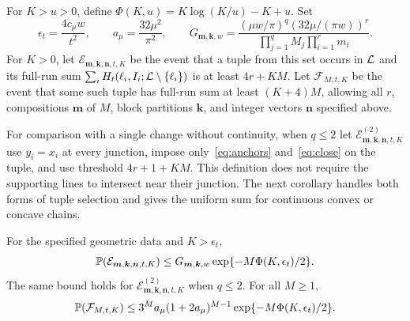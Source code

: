 \documentclass[11pt,letterpaper]{article}
\begin{document}
For $K>u>0$, define $\Phi(K,u)=K\log(K/u)-K+u$. Set
\begin{equation}\label{eq:constants}
 \epsilon_t=\frac{4c_\mu w}{t^2},\qquad
 a_\mu=\frac{32\mu^2}{\pi^2},\qquad
 G_{\boldsymbol m,\boldsymbol k,w}
 =\frac{(\mu w/\pi)^q(32\mu/(\pi w))^r}
        {\prod_{j=1}^qM_j\prod_{i=1}^r m_i}.
\end{equation}
For $K>0$, let $\mathcal E_{\boldsymbol m,\boldsymbol k,\boldsymbol n,t,K}$ be the event that a tuple from this set occurs in $\cL$ and its full-run sum $\sum_iH_t(\ell_i,I_i;\cL\setminus\{\ell_i\})$ is at least $4r+KM$. Let $\mathcal F_{M,t,K}$ be the event that some such tuple has full-run sum at least $(K+4)M$, allowing all $r$, compositions $\boldsymbol m$ of $M$, block partitions $\boldsymbol k$, and integer vectors $\boldsymbol n$ specified above.

For comparison with a single change without continuity, when $q\le2$ let $\mathcal E^{(2)}_{\boldsymbol m,\boldsymbol k,\boldsymbol n,t,K}$ use $y_i=x_i$ at every junction, impose only~\eqref{eq:anchors} and~\eqref{eq:close} on the tuple, and use threshold $4r+1+KM$. This definition does not require the supporting lines to intersect near their junction. The next corollary handles both forms of tuple selection and gives the uniform sum for continuous convex or concave chains.

\begin{corollary}\label{cor:selected}
For the specified geometric data and $K>\epsilon_t$,
\begin{equation}\label{eq:selected}
 \P(\mathcal E_{\boldsymbol m,\boldsymbol k,\boldsymbol n,t,K})
 \le G_{\boldsymbol m,\boldsymbol k,w}
             \exp\{-M\Phi(K,\epsilon_t)/2\}.
\end{equation}
The same bound holds for $\mathcal E^{(2)}_{\boldsymbol m,\boldsymbol k,\boldsymbol n,t,K}$ when $q\le2$. For all $M\ge1$,
\begin{equation}\label{eq:all}
 \P(\mathcal F_{M,t,K})
 \le3^M a_\mu(1+2a_\mu)^{M-1}
                  \exp\{-M\Phi(K,\epsilon_t)/2\}.
\end{equation}
\end{corollary}
\end{document}

